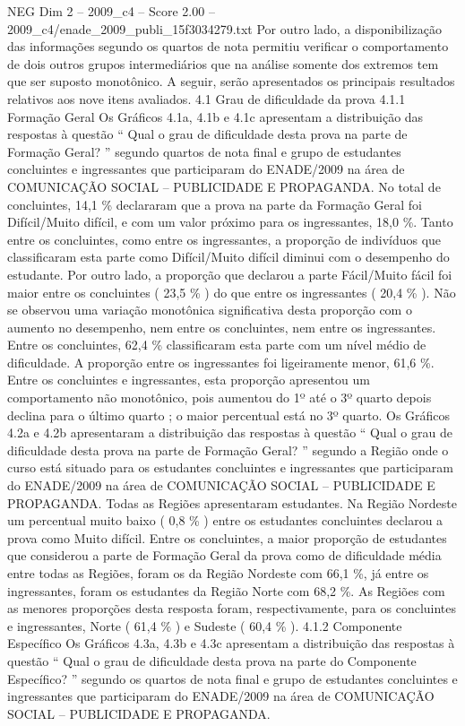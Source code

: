 \begin{textsample}{NEG Dim 2 – 2009\_c4 – Score 2.00 – 2009\_c4/enade\_2009\_publi\_15f3034279.txt}
Por outro lado, a disponibilização das informações segundo os quartos de nota permitiu verificar o comportamento de dois outros grupos intermediários que na análise somente dos extremos tem que ser suposto monotônico.
A seguir, serão apresentados os principais resultados relativos aos nove itens avaliados. 4.1 Grau de dificuldade da prova 4.1.1 Formação Geral Os Gráficos 4.1a, 4.1b e 4.1c apresentam a distribuição das respostas à questão “ Qual o grau de dificuldade desta prova na parte de Formação Geral? ” segundo quartos de nota final e grupo de estudantes concluintes e ingressantes que participaram do ENADE/2009 na área de COMUNICAÇÃO SOCIAL – PUBLICIDADE E PROPAGANDA.
No total de concluintes, 14,1 \% declararam que a prova na parte da Formação Geral foi Difícil/Muito difícil, e com um valor próximo para os ingressantes, 18,0 \%.
Tanto entre os concluintes, como entre os ingressantes, a proporção de indivíduos que classificaram esta parte como Difícil/Muito difícil diminui com o desempenho do estudante.
Por outro lado, a proporção que declarou a parte Fácil/Muito fácil foi maior entre os concluintes ( 23,5 \% ) do que entre os ingressantes ( 20,4 \% ).
Não se observou uma variação monotônica significativa desta proporção com o aumento no desempenho, nem entre os concluintes, nem entre os ingressantes.
Entre os concluintes, 62,4 \% classificaram esta parte com um nível médio de dificuldade.
A proporção entre os ingressantes foi ligeiramente menor, 61,6 \%.
Entre os concluintes e ingressantes, esta proporção apresentou um comportamento não monotônico, pois aumentou do 1º até o 3º quarto depois declina para o último quarto ; o maior percentual está no 3º quarto.
Os Gráficos 4.2a e 4.2b apresentaram a distribuição das respostas à questão “ Qual o grau de dificuldade desta prova na parte de Formação Geral? ” segundo a Região onde o curso está situado para os estudantes concluintes e ingressantes que participaram do ENADE/2009 na área de COMUNICAÇÃO SOCIAL – PUBLICIDADE E PROPAGANDA.
Todas as Regiões apresentaram estudantes.
Na Região Nordeste um percentual muito baixo ( 0,8 \% ) entre os estudantes concluintes declarou a prova como Muito difícil.
Entre os concluintes, a maior proporção de estudantes que considerou a parte de Formação Geral da prova como de dificuldade média entre todas as Regiões, foram os da Região Nordeste com 66,1 \%, já entre os ingressantes, foram os estudantes da Região Norte com 68,2 \%.
As Regiões com as menores proporções desta resposta foram, respectivamente, para os concluintes e ingressantes, Norte ( 61,4 \% ) e Sudeste ( 60,4 \% ). 4.1.2 Componente Específico Os Gráficos 4.3a, 4.3b e 4.3c apresentam a distribuição das respostas à questão “ Qual o grau de dificuldade desta prova na parte do Componente Específico? ” segundo os quartos de nota final e grupo de estudantes concluintes e ingressantes que participaram do ENADE/2009 na área de COMUNICAÇÃO SOCIAL – PUBLICIDADE E PROPAGANDA.

\end{textsample}
